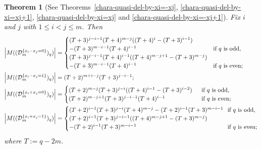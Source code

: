 \documentclass{article}
\theoremstyle{plain}
\newtheorem{Them}{Theorem}[section]
\theoremstyle{definition}
\theoremstyle{remark}
\numberwithin{equation}{section}
\newcommand{\Dc}{\mathcal{D}}
\begin{document}
\begin{Them}[See Theorems~\ref{chara-quasi-del-by-xi=-xj}, \ref{chara-quasi-del-by-xi=xj+1}, \ref{chara-quasi-del-by-xi=xj} and \ref{chara-quasi-del-by-xi=-xj+1}]\label{thm-main-typeD}
Fix $i$ and $j$ with $1\leq i<j \leq m$. Then 
    \begin{align*}
    \left|M((\Dc_m^{\{x_i-x_j=0\}})_q)\right|&=
    \begin{cases}
        (T+3)^{j-i-1}(T+4)^{m-j}((T+4)^i-(T+3)^{i-1})\\
        -(T+3)^{m-i-1}(T+4)^{i-1}\;\;\;& \text{if $q$ is odd},\\
        (T+3)^{j-i-1}(T+4)^{i-1}((T+4)^{m-j+1}-(T+3)^{m-j}) \\
        -(T+3)^{m-i-1}(T+4)^{i-1} & \text{if $q$ is even}; 
    \end{cases} \\
    \left|M((\Dc_m^{\{x_i-x_j=1\}})_q)\right|&=
    (T+2)^{m+i-j}(T+3)^{j-i-1}; \\
    \left|M((\Dc_m^{\{x_i+x_j=0\}})_q)\right|&=
    \begin{cases}
        (T+2)^{m-j}(T+3)^{j-i}((T+4)^{i-1}-(T+3)^{i-2}) \;\;&\text{if $q$ is odd}, \\
        (T+2)^{m-j+1}(T+3)^{j-i-1}(T+4)^{i-1} & \text{if $q$ is even}; 
    \end{cases} \\
    \left|M((\Dc_m^{\{x_i+x_j=1\}})_q)\right|&=
    \begin{cases}
        (T+2)^{i-1}(T+3)^{j-i}(T+4)^{m-j} - (T+2)^{i-1}(T+3)^{m-i-1} \;\;& \hspace{-0.3cm}\text{if $q$ is odd}, \\
    (T+2)^{i-1}(T+3)^{j-i-1}((T+4)^{m-j+1}-(T+3)^{m-j}) \\
    - (T+2)^{i-1}(T+3)^{m-i-1}& \hspace{-0.3cm} \text{if $q$ is even}; 
    \end{cases}
\end{align*}
where $T:=q-2m$. 
\end{Them}
\end{document}
